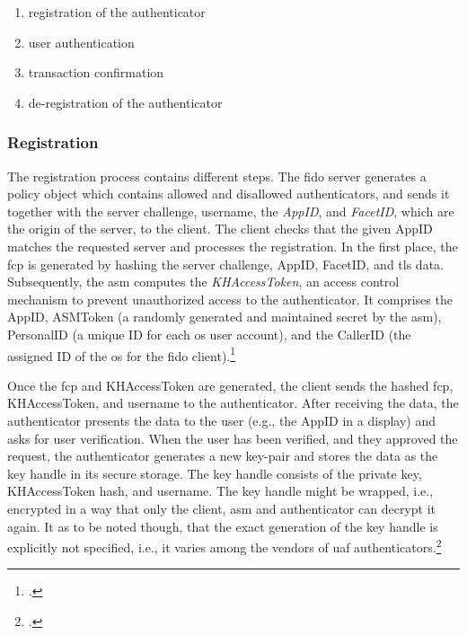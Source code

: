 \begin{enumerate}
	\item registration of the authenticator
	\item user authentication
	\item transaction confirmation
	\item de-registration of the authenticator
\end{enumerate}

\subsubsection{Registration}

The registration process contains different steps. The \gls{fido} server generates a policy object which contains allowed and disallowed authenticators, and sends it together with the server challenge, username, the \textit{AppID}, and \textit{FacetID}, which are the origin of the server, to the client. The client checks that the given AppID matches the requested server and processes the registration. In the first place, the \gls{fcp} is generated by hashing the server challenge, AppID, FacetID, and \gls{tls} data. Subsequently, the \gls{asm} computes the \textit{KHAccessToken}, an access control mechanism to prevent unauthorized access to the authenticator. It comprises the AppID, ASMToken (a randomly generated and maintained secret by the \gls{asm}), PersonalID (a unique ID for each \gls{os} user account), and the CallerID (the assigned ID of the \gls{os} for the \gls{fido} client).\footcites[See][131--132]{10.1007/978-3-319-67639-5_11}[See][17--19]{uaf-protocol}

Once the \gls{fcp} and KHAccessToken are generated, the client sends the hashed \gls{fcp}, KHAccessToken, and username to the authenticator. After receiving the data, the authenticator presents the data to the user (e.g., the AppID in a display) and asks for user verification. When the user has been verified, and they approved the request, the authenticator generates a new key-pair and stores the data as the key handle in its secure storage. The key handle consists of the private key, KHAccessToken hash, and username. The key handle might be wrapped, i.e., encrypted in a way that only the client, \gls{asm} and authenticator can decrypt it again. It as to be noted though, that the exact generation of the key handle is explicitly not specified, i.e., it varies among the vendors of \gls{uaf} authenticators.\footcites[See][9, 16--17]{uaf-asm}

